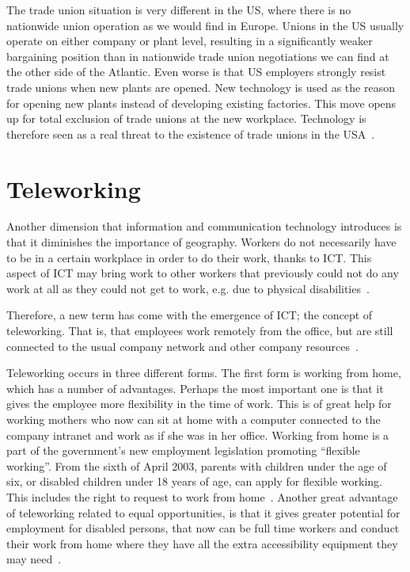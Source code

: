 \documentclass[a4paper,12pt,titlepage]{article}
\begin{document}
  The trade union situation is
  very different in the US, where there is no nationwide union
  operation as we would find in Europe. Unions in the US usually operate
  on either company or plant level, resulting in a significantly
  weaker bargaining position than in nationwide trade union
  negotiations we can find at the other side of the Atlantic.
  Even worse is that US employers strongly resist trade unions
  when new plants are opened. New technology is used as the
  reason for opening new plants instead of developing existing
  factories. This move opens up for total exclusion of trade
  unions at the new workplace. Technology is therefore
  seen as a real threat to the existence of trade
  unions in the USA~\cite[45]{ek}.

  \section{Teleworking}
  Another dimension that information and communication technology introduces is that it
  diminishes the importance of geography. Workers do not necessarily have to
  be in a certain workplace in order to do their work, thanks to ICT. This aspect
  of ICT may bring work to other workers that previously could not do any work
  at all as they could not get to work, e.g. due to physical disabilities~\cite[199]{gr}.

  Therefore, a new term has come with the emergence of ICT;
  the concept of teleworking. That is, that employees work remotely
  from the office, but are still connected to the usual company network
  and other company resources~\cite[91]{ahdb}. 

  Teleworking occurs in three different forms. The first form is working from
  home, which has a number of advantages. Perhaps the most important
  one is that it gives the employee more flexibility in the time of work. This
  is of great help for working mothers who now can sit at home with a
  computer connected to the company intranet and work as if she was in her
  office. Working from home is a part of the government's new employment
  legislation promoting ``flexible working''.
  From the sixth of April 2003, parents with children under
  the age of six, or disabled children under 18 years of age, can apply
  for flexible working. This includes the right to request to work from
  home~\cite{dti}. Another great advantage of teleworking related to
  equal opportunities, is that it gives greater potential for employment
  for disabled persons, that now can be full time workers and conduct their
  work from home where they have all the extra accessibility equipment
  they may need~\cite[40]{mnpb}.
  
\end{document}
